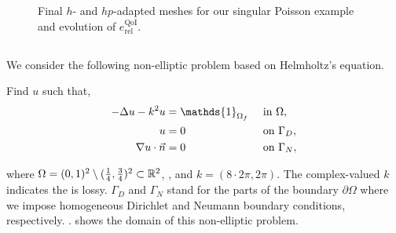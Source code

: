 \pagebreak

\begin{figure}
  \caption{Final $h$- and $hp$-adapted meshes for our singular Poisson example and evolution of $e_{\textrm{rel}}^{\textrm{QoI}}$.}
  \label{fig:CrossGOA}
\end{figure}

\pagebreak

\subsection{}
We consider the following non-elliptic problem based on Helmholtz's equation.
\begin{var_for}
  Find $u$ such that,
  \begin{alignat}{2}
    - \Delta u -k^{2}u   & = \mathds{1}_{\Omega_{f}} &  & \text{ in } \Omega,   \label{eq:helmholtzgoal} \\
    u                    & =0                        &  & \text{ on } {\Gamma_{D}},                      \\
    \grad u\cdot \vec{n} & =0                        &  & \text{ on } {\Gamma_{N}},
  \end{alignat}
\end{var_for}
\noindent where  $\Omega = (0,1)^{2} \setminus (\frac{1}{4},\frac{3}{4})^{2} \subset \mathbb{R}^{2}$, , and $k = (8 \cdot 2 \pi, 2 \pi)$. The complex-valued $k$ indicates the  is lossy. $\Gamma_{D}$ and $\Gamma_{N}$ stand for the parts of the boundary $\partial \Omega$ where we impose homogeneous Dirichlet and Neumann boundary conditions, respectively.   .   shows the domain of this non-elliptic problem.

